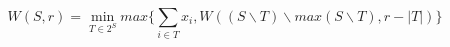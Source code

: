 \begin{equation}
	W(S, r) = \min_{T \in 2^S} max \{\sum_{i \in T} x_i, W((S \backslash T) \backslash max(S\backslash T), r - |T|)\}
\end{equation} 
